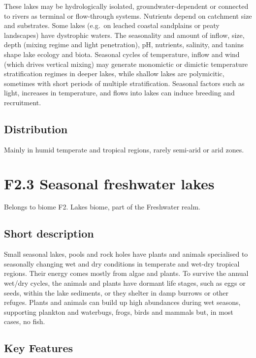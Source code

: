 \documentclass[
  letterpaper,
  DIV=11,
  numbers=noendperiod]{scrartcl}
\begin{document}
These lakes may be hydrologically isolated, groundwater-dependent or
connected to rivers as terminal or flow-through systems. Nutrients
depend on catchment size and substrates. Some lakes (e.g.~on leached
coastal sandplains or peaty landscapes) have dystrophic waters. The
seasonality and amount of inflow, size, depth (mixing regime and light
penetration), pH, nutrients, salinity, and tanins shape lake ecology and
biota. Seasonal cycles of temperature, inflow and wind (which drives
vertical mixing) may generate monomictic or dimictic temperature
stratification regimes in deeper lakes, while shallow lakes are
polymicitic, sometimes with short periods of multiple stratification.
Seasonal factors such as light, increases in temperature, and flows into
lakes can induce breeding and recruitment.

\subsection{Distribution}\label{distribution-118}

Mainly in humid temperate and tropical regions, rarely semi-arid or arid
zones.

\section{F2.3 Seasonal freshwater
lakes}\label{f2.3-seasonal-freshwater-lakes-1}

Belongs to biome F2. Lakes biome, part of the Freshwater realm.

\subsection{Short description}\label{short-description-119}

Small seasonal lakes, pools and rock holes have plants and animals
specialised to seasonally changing wet and dry conditions in temperate
and wet-dry tropical regions. Their energy comes mostly from algae and
plants. To survive the annual wet/dry cycles, the animals and plants
have dormant life stages, such as eggs or seeds, within the lake
sediments, or they shelter in damp burrows or other refuges. Plants and
animals can build up high abundances during wet seasons, supporting
plankton and waterbugs, frogs, birds and mammals but, in most cases, no
fish.

\subsection{Key Features}\label{key-features-119}
\end{document}
